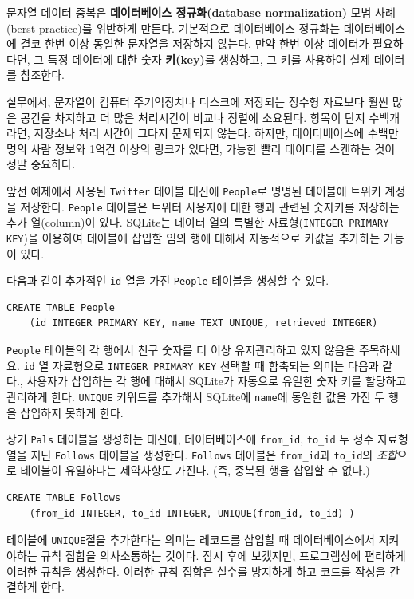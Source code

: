 문자열 데이터 중복은 {\bf 데이터베이스 정규화(database normalization)} 모범 사례(berst practice)를 위반하게 만든다.
기본적으로 데이터베이스 정규화는 데이터베이스에 결코 한번 이상 동일한 문자열을 저장하지 않는다. 
만약 한번 이상 데이터가 필요하다면, 그 특정 데이터에 대한 숫자 {\bf 키(key)}를 생성하고, 그 키를 사용하여 실제 데이터를 참조한다.

실무에서, 문자열이 컴퓨터 주기억장치나 디스크에 저장되는 정수형 자료보다 훨씬 많은 공간을 차지하고 더 많은 처리시간이 비교나 정렬에 소요된다.
항목이 단지 수백개라면, 저장소나 처리 시간이 그다지 문제되지 않는다. 
하지만, 데이터베이스에 수백만명의 사람 정보와 1억건 이상의 링크가 있다면, 가능한 빨리 데이터를 스캔하는 것이 정말 중요하다.

앞선 예제에서 사용된 {\tt Twitter} 테이블 대신에 {\tt People}로 명명된 테이블에 트위커 계정을 저장한다.
{\tt People} 테이블은 트위터 사용자에 대한 행과 관련된 숫자키를 저장하는 추가 열(column)이 있다.
SQLite는 데이터 열의 특별한  자료형({\tt INTEGER PRIMARY KEY})을 이용하여 테이블에 삽입할 임의 행에 대해서 자동적으로 키값을 추가하는 기능이 있다.

다음과 같이 추가적인 {\tt id} 열을 가진 {\tt People} 테이블을 생성할 수 있다.

\beforeverb
\begin{verbatim}
CREATE TABLE People 
    (id INTEGER PRIMARY KEY, name TEXT UNIQUE, retrieved INTEGER)
\end{verbatim}
\afterverb
%

{\tt People} 테이블의 각 행에서 친구 숫자를 더 이상 유지관리하고 있지 않음을 주목하세요.
{\tt id} 열 자료형으로 {\tt INTEGER PRIMARY KEY} 선택할 때 함축되는 의미는 다음과 같다., 
사용자가 삽입하는 각 행에 대해서  SQLite가 자동으로 유일한 숫자 키를 할당하고 관리하게 한다.
{\tt UNIQUE} 키워드를 추가해서 SQLite에 {\tt name}에 동일한 값을 가진 두 행을 삽입하지 못하게 한다.

상기 {\tt Pals} 테이블을 생성하는 대신에, 데이터베이스에 \verb"from_id", \verb"to_id" 두 정수 자료형 열을 지닌 {\tt Follows} 테이블을 생성한다.
{\tt Follows} 테이블은 \verb"from_id"과 \verb"to_id"의 \emph{조합}으로 테이블이 유일하다는 제약사항도 가진다. (즉, 중복된 행을 삽입할 수 없다.)

\beforeverb
\begin{verbatim}
CREATE TABLE Follows 
    (from_id INTEGER, to_id INTEGER, UNIQUE(from_id, to_id) )
\end{verbatim}
\afterverb
%

테이블에 {\tt UNIQUE}절을 추가한다는 의미는 레코드를 삽입할 때 데이터베이스에서 지켜야하는 규칙 집합을 의사소통하는 것이다.
잠시 후에 보겠지만, 프로그램상에 편리하게 이러한 규칙을 생성한다.
이러한 규칙 집합은 실수를 방지하게 하고 코드를 작성을 간결하게 한다.

